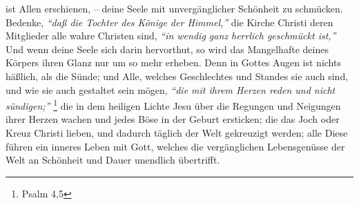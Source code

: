 ist Allen erschienen, -- deine Seele mit unvergänglicher Schönheit zu schmücken.
Bedenke, \textit{"`daß die Tochter des Könige der Himmel,"'} die Kirche Christi
 deren
 Mitglieder alle wahre Christen
sind, \textit{"`in wendig ganz herrlich geschmückt ist,"'}
Und wenn deine Seele sich  darin hervorthut, so wird das Mangelhafte deines
Körpers ihren Glanz nur um so mehr erheben. Denn in Gottes Augen ist nichts
häßlich, als die Sünde; und Alle, welches Geschlechtes und Standes
sie auch
sind, und wie sie auch gestaltet sein mögen,
\textit{"`die mit ihrem Herzen reden und
nicht sündigen;"'}
\footnote{Psalm 4,5}
die in dem heiligen Lichte Jesu über die
Regungen und Neigungen ihrer Herzen wachen und jedes Böse in der Geburt
ersticken; die das Joch oder Kreuz Christi  lieben, und dadurch
täglich der Welt
gekreuzigt werden; alle Diese führen ein inneres Leben mit
Gott, welches die
vergänglichen Lebensgenüsse der Welt an Schönheit und Dauer unendlich
übertrifft.
